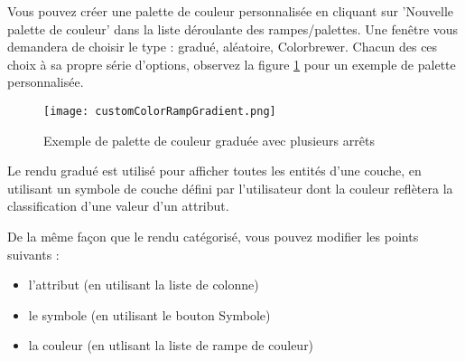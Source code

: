 
Vous pouvez créer une palette de couleur personnalisée en cliquant sur 'Nouvelle palette de couleur' dans la liste déroulante des rampes/palettes. Une fenêtre vous demandera de choisir le type : gradué, aléatoire, Colorbrewer. Chacun des ces choix à sa propre série d'options, observez la figure \ref{fig:ccrg} pour un exemple de palette personnalisée.

\begin{figure}[ht]
   \centering
   \caption{Exemple de palette de couleur graduée avec plusieurs arrêts \nixcaption}\label{fig:ccrg}
   \texttt{[image: customColorRampGradient.png]}
\end{figure}


Le rendu gradué est utilisé pour afficher toutes les entités d'une couche, en utilisant un symbole de couche défini par l'utilisateur dont la couleur reflètera la classification d'une valeur d'un attribut.

De la même façon que le rendu catégorisé, vous pouvez modifier les points suivants :

\begin{itemize}[label=--]
\item l'attribut (en utilisant la liste de colonne)
\item le symbole (en utilisant le bouton Symbole)
\item la couleur (en utlisant la liste de rampe de couleur)
\end{itemize}

